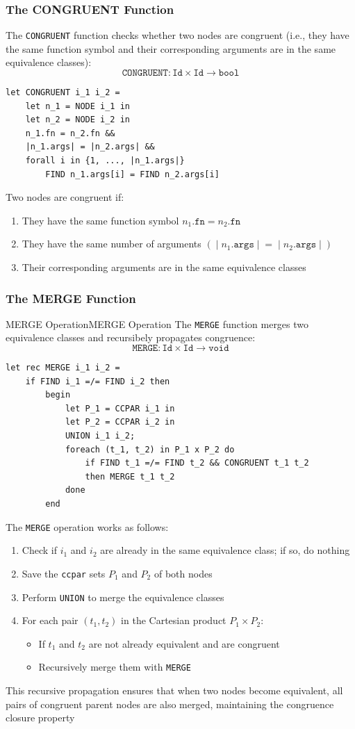 \documentclass[a4paper]{article}
\theoremstyle{definition}
\begin{document}
\subsubsection{The CONGRUENT Function}
The \texttt{CONGRUENT} function checks whether two nodes are congruent (i.e., they have the same function symbol 
and their corresponding arguments are in the same equivalence classes):
\[
  \texttt{CONGRUENT}: \texttt{Id} \times \texttt{Id} \rightarrow \texttt{bool}
\]
\begin{lstlisting}[style=ocamlpseudo]
let CONGRUENT i_1 i_2 = 
	let n_1 = NODE i_1 in 
	let n_2 = NODE i_2 in 
	n_1.fn = n_2.fn &&
	|n_1.args| = |n_2.args| &&
	forall i in {1, ..., |n_1.args|}
		FIND n_1.args[i] = FIND n_2.args[i]
\end{lstlisting}
Two nodes are congruent if:
\begin{enumerate}
	\item They have the same function symbol \( n_1.\texttt{fn} = n_2.\texttt{fn} \)   
	\item They have the same number of arguments \( (\;|\;n_1.\texttt{args}\;|\; = \;|\;n_2.\texttt{args}\;|\;) \)   
	\item Their corresponding arguments are in the same equivalence classes
\end{enumerate}
\subsubsection{The MERGE Function}
\begin{definition}{MERGE Operation}{MERGE Operation}
The \texttt{MERGE} function merges two equivalence classes and recursibely propagates congruence:
\[
  \texttt{MERGE}: \texttt{Id} \times \texttt{Id} \rightarrow \texttt{void}
\]
\begin{lstlisting}[style=ocamlpseudo]
let rec MERGE i_1 i_2 = 
	if FIND i_1 =/= FIND i_2 then 
		begin
			let P_1 = CCPAR i_1 in
			let P_2 = CCPAR i_2 in 
			UNION i_1 i_2;
			foreach (t_1, t_2) in P_1 x P_2 do 
				if FIND t_1 =/= FIND t_2 && CONGRUENT t_1 t_2
				then MERGE t_1 t_2
			done
		end
\end{lstlisting}
The \texttt{MERGE} operation works as follows:
\begin{enumerate}
	\item Check if \( i_1 \) and \( i_2 \) are already in the same equivalence class; if so, do nothing 
	\item Save the \texttt{ccpar} sets \( P_1 \) and \( P_2 \) of both nodes 
	\item Perform \texttt{UNION} to merge the equivalence classes 
	\item For each pair \( (t_1,t_2) \) in the Cartesian product \( P_1 \times P_2 \):
	\begin{itemize}
		\item If \( t_1 \) and \( t_2 \) are not already equivalent and are congruent 
		\item Recursively merge them with \texttt{MERGE}
	\end{itemize}
\end{enumerate}
\end{definition}
This recursive propagation ensures that when two nodes become equivalent, all pairs of congruent parent nodes are also merged, maintaining the 
congruence closure property
\end{document}
